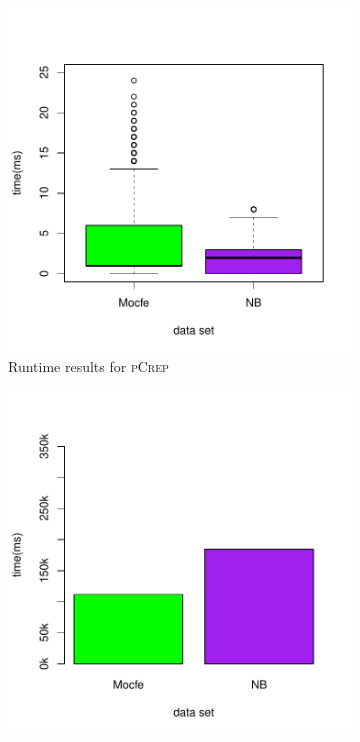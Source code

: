 \documentclass[a4paper,UKenglish,cleveref, autoref, thm-restate,authorcolumns]{lipics-v2019}
\newcommand{\adjDel}{\textsc{pCrep}}
\begin{document}
\begin{figure}
	\centering
	\begin{minipage}{0.48\linewidth}
		\begin{subfigure}[b]{\linewidth}
			\includegraphics*[width=\linewidth]{plots/new_time_hpc_filtered_decompTree}
			\caption{Runtime results for \adjDel}
		\end{subfigure}		
	\end{minipage}
	\begin{minipage}{0.48\linewidth}
		\begin{subfigure}[b]{\linewidth}
			\includegraphics*[width=\linewidth]{plots/new_barplot_time_hpc_filtered_decompTree}

\end{subfigure}
\end{minipage}
\end{figure}
\end{document}
